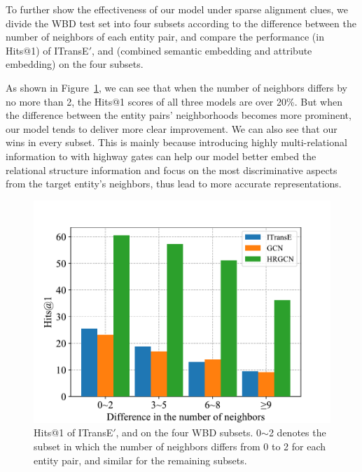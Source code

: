 To further show the effectiveness of our model under sparse alignment clues, we divide the WBD test set into four subsets according to the difference between the number of neighbors of each entity pair, and compare the performance (in Hits@1) of ITransE$'$, \GCN and \HRGCN (combined semantic embedding and attribute embedding) on the four subsets.

As shown in Figure~\ref{subset}, we can see that when the number of neighbors differs by no more than 2, the Hits@1 scores of all three models are over 20\%.
But when the difference between the entity pairs' neighborhoods becomes more prominent,
our \HRGCN model tends to deliver more clear improvement. We can also see that our \HRGCN wins \GCN in every subset.
This is mainly because introducing highly multi-relational information to \GCN with highway gates can help our model better embed the relational structure information and focus on the most discriminative aspects from the target entity's neighbors, thus lead to more accurate representations.
\begin{figure}
	\centering
	\includegraphics[width=0.8\linewidth]{figures/graph4.pdf}
	\caption{Hits@1 of ITransE$'$, \GCN and \HRGCN on the four WBD subsets. 0$\sim$2 denotes the subset in which the number of neighbors differs from 0 to 2 for each entity pair, and similar for the remaining subsets.}
	\label{subset}
\end{figure}

